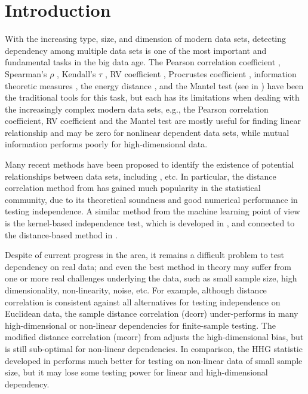 \documentclass[11pt]{article}
\begin{document}
\section{Introduction}
With the increasing type, size, and dimension of modern data sets, detecting dependency among multiple data sets is one of the most important and fundamental tasks in the big data age. The Pearson correlation coefficient \cite{XXX}, Spearman's $\rho$ \cite{XXX}, Kendall's $\tau$ \cite{XXX},  RV coefficient \cite{XXX}, Procrustes coefficient \cite{XXX}, information theoretic measures \cite{Renyi1959}, the energy distance \cite{XXX}, and the Mantel test (see in \cite{JosseHolmes2013, RobertEscoufier1976, Mantel1967}) have been the traditional tools for this task, but each has its limitations when dealing with the increasingly complex modern data sets, e.g., the Pearson correlation coefficient, RV coefficient and the Mantel test are mostly useful for finding linear relationship and may be zero for nonlinear dependent data sets, while mutual information performs poorly for high-dimensional data. 

Many recent methods have been proposed to identify the existence of potential relationships between data sets, including \cite{Baringhaus2004,TaskinenOjaRandles2005, GrettonEtAl2005, SzekelyRizzoBakirov2007, GrettonGyorfi2010,Reshef2011, HellerGorfine2013, Reimherr2013, SzekelyRizzo2013a}, etc. In particular, the distance correlation method from \cite{SzekelyRizzoBakirov2007}  has gained much popularity in the statistical community, due to its theoretical soundness and good numerical performance in testing independence. A similar method from the machine learning point of view is the kernel-based independence test, which is developed in \cite{GrettonEtAl2005, GrettonGyorfi2010, GrettonEtAl2012}, and connected to the distance-based method in \cite{SejdinovicEtAl2013}.

Despite of current progress in the area, it remains a difficult problem to test dependency on real data; and even the best method in theory may suffer from one or more real challenges underlying the data, such as small sample size, high dimensionality, non-linearity, noise, etc. For example, although distance correlation is consistent against all alternatives for testing independence on Euclidean data, the sample distance correlation (dcorr) under-performs in many high-dimensional or non-linear dependencies for finite-sample testing. The modified distance correlation (mcorr) from \cite{SzekelyRizzo2013a} adjusts the high-dimensional bias, but is still sub-optimal for non-linear dependencies. In comparison, the HHG statistic developed in \cite{HellerGorfine2013} performs much better for testing on non-linear data of small sample size, but it may lose some testing power for linear and high-dimensional dependency.
\end{document}
